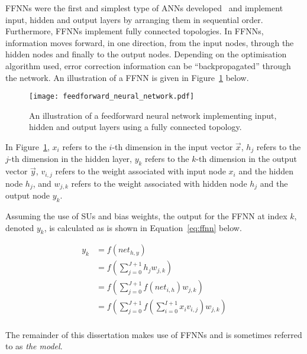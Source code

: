 \acp{FFNN} were the first and simplest type of \acp{ANN} developed~\cite{ref:schmidhuber:2015} and implement input, hidden and output layers by arranging them in sequential order. Furthermore, \acp{FFNN} implement fully connected topologies. In \acp{FFNN}, information moves forward, in one direction, from the input nodes, through the hidden nodes and finally to the output nodes. Depending on the optimisation algorithm used, error correction information can be ``backpropagated'' through the network. An illustration of a \acs{FFNN} is given in Figure~\ref{fig:ffnn} below.

\begin{figure}[htpb]
      \centering
      \texttt{[image: feedforward\_neural\_network.pdf]}
      \caption[A feedforward neural network]{An illustration of a feedforward neural network implementing input, hidden and output layers using a fully connected topology.}
      \label{fig:ffnn}
\end{figure}

\noindent
In Figure~\ref{fig:ffnn}, $x_i$ refers to the $i$-th dimension in the input vector $\vec{x}$, $h_j$ refers to the $j$-th dimension in the hidden layer, $y_k$ refers to the $k$-th dimension in the output vector $\vec{y}$, $v_{i,j}$ refers to the weight associated with input node $x_i$ and the hidden node $h_j$, and $w_{j,k}$ refers to the weight associated with hidden node $h_j$ and the output node $y_k$.

Assuming the use of \acp{SU} and bias weights, the output for the \acs{FFNN} at index $k$, denoted $y_k$, is calculated as is shown in Equation~\eqref{eq:ffnn} below.

\begin{equation}
      \label{eq:ffnn}
      \begin{split}
            y_k &= f\left(net_{h,y}\right) \\
            &= f\left(\sum_{j=0}^{J+1} h_j w_{j,k}\right) \\
            &= f\left(\sum_{j=0}^{J+1} f\left(net_{i,h}\right) w_{j,k}\right) \\
            &= f\left(\sum_{j=0}^{J+1} f\left(\sum_{i=0}^{I+1} x_i v_{i,j}\right) w_{j,k}\right) \\
      \end{split}
\end{equation}

\noindent
The remainder of this dissertation makes use of \acp{FFNN} and is sometimes referred to as \textit{the model}.


